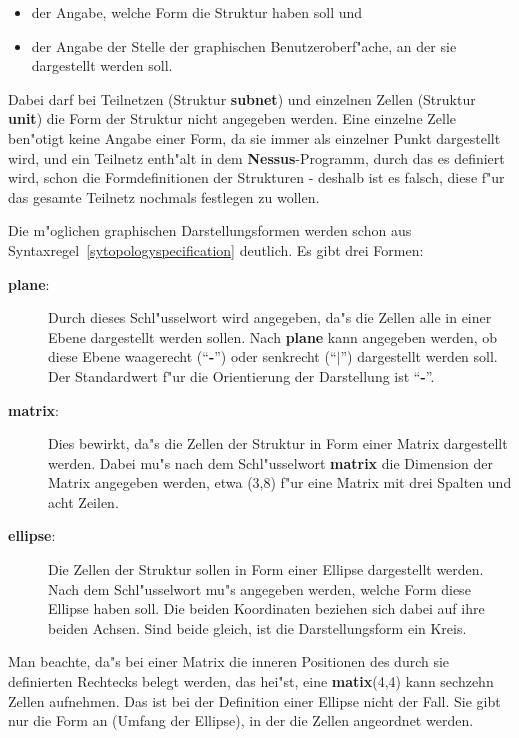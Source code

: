\begin{itemize}
  \item der Angabe, welche Form die Struktur haben soll und
  \item der Angabe der Stelle der graphischen Benutzeroberf"ache, an der sie dargestellt
 	werden soll.
\end{itemize}

Dabei darf bei Teilnetzen (Struktur {\bf subnet}) und einzelnen Zellen
(Struktur {\bf unit}) die Form der Struktur nicht angegeben werden.
Eine einzelne Zelle ben"otigt keine Angabe einer Form, da sie immer
als einzelner Punkt dargestellt wird, und ein Teilnetz enth"alt in dem
{\bf Nessus}-Programm, durch das es definiert wird, schon die
Formdefinitionen der Strukturen
- deshalb ist es falsch, diese f"ur das gesamte Teilnetz nochmals
festlegen zu wollen.

Die m"oglichen graphischen Darstellungsformen werden schon aus
Syntaxregel~\ref{sytopologyspecification} deutlich. Es gibt drei
Formen:
\begin{description}
  \item[{\bf plane}:~~~] Durch dieses Schl"usselwort wird angegeben, da"s die Zellen alle
	in einer Ebene dargestellt werden sollen. Nach {\bf plane} kann angegeben werden,
	ob diese Ebene waagerecht (``{\bf -}'') oder senkrecht (``{\bf $|$}'') dargestellt
	werden soll. Der Standardwert f"ur die Orientierung der Darstellung ist ``{\bf -}''.
  \item[{\bf matrix}:~~] Dies bewirkt, da"s die Zellen der Struktur in Form einer Matrix
	dargestellt werden. Dabei mu"s nach dem Schl"usselwort {\bf matrix} die Dimension
	der Matrix angegeben werden, etwa (3,8) f"ur eine Matrix mit drei Spalten und acht
	Zeilen. 
  \item[{\bf ellipse}:~] Die Zellen der Struktur sollen in Form einer
Ellipse dargestellt 
	werden. Nach dem Schl"usselwort mu"s angegeben werden, welche Form diese Ellipse
	haben soll. Die beiden Koordinaten beziehen sich dabei auf ihre beiden
	Achsen. Sind beide gleich, ist die Darstellungsform ein Kreis.
\end{description}

Man beachte, da"s bei einer Matrix die inneren
Positionen des durch sie definierten
Rechtecks belegt werden, das hei"st, eine {\bf matix}(4,4) kann
sechzehn Zellen aufnehmen. Das ist bei der Definition einer
Ellipse nicht der Fall. Sie gibt nur die Form an
(Umfang der Ellipse), in der die Zellen angeordnet werden.

